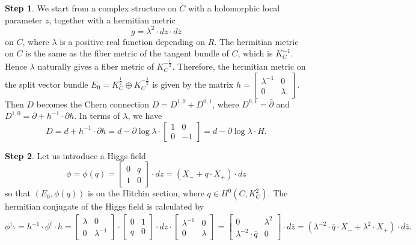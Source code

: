 \documentclass[oneside, 11pt]{amsart}
\theoremstyle{definition}
\newtheorem{step}{Step}
\numberwithin{equation}{subsection}
\def\lam{\lambda}
\newcommand{\half}{{\frac{1}{2}}}
\begin{document}
{\begin{step}
 We start from a complex structure on $C$
 with a holomorphic local parameter $z$, together
 with a  hermitian metric 
 $$g=\lambda^2 \cdot dz \cdot d\bar{z}$$
 on $C$, where
 $\lam$ is a positive
 real function depending on $R$.  The hermitian
 metric on $C$ is the same as the fiber metric of 
 the tangent bundle of $C$, which is $K_C^{-1}$. 
 Hence $\lam$ naturally gives  a fiber metric
 of $K_C^{-\half}$. Therefore, 
 the hermitian metric on the split vector bundle $E_0=K_C^{\frac{1}{2}}\oplus K_C^{-\frac{1}{2}}$ is given by the matrix
$h=\begin{bmatrix}
\lambda^{-1} &0\\
0&\lambda.
\end{bmatrix}$.
 Then $D$ becomes the Chern connection
 $D = D^{1,0}+D^{0,1}$, where
$
D^{0,1}=\bar{\partial}$ and
$ D^{1,0}=\partial+h^{-1}\cdot \partial h.
$
In terms of $\lam$, we have
$$
D=d+h^{-1}\cdot \partial h=d-\partial \log \lambda\cdot \begin{bmatrix}
1 &0\\
0&-1
\end{bmatrix} = d-\partial \log\lam\cdot H.
$$
\end{step}


\begin{step}
Let us introduce a Higgs field 
$$
\phi=\phi(q)=\begin{bmatrix}
0 & q\\
1& 0
\end{bmatrix}\cdot dz
=(X_-+q\cdot X_+) \cdot dz
$$ 
so that $(E_0,\phi(q))$ is on the Hitchin section,
where $q\in H^0\left(C,K_C^2\right)$.  The
hermitian conjugate of the Higgs field is 
calculated by 
$$
\phi^{\dagger_h}=h^{-1}\cdot \overline{\phi^{t}}\cdot h=
\begin{bmatrix}
\lambda &0\\
0&\lambda^{-1}
\end{bmatrix}\cdot
\overline{\begin{bmatrix}
0 & 1\\
q & 0
\end{bmatrix}\cdot dz} \cdot
\begin{bmatrix}
\lambda^{-1} &0\\
0&\lambda
\end{bmatrix}=
\begin{bmatrix}
0 & \lambda^2\\
\lambda^{-2} \cdot \overline{q}&0
\end{bmatrix} \cdot d\bar{z}
=\left(\lam^{-2}\cdot \bar{q}\cdot X_-+\lam^2 \cdot X_+\right)\cdot d\bar{z}.
$$
\end{step}

}
\end{document}
